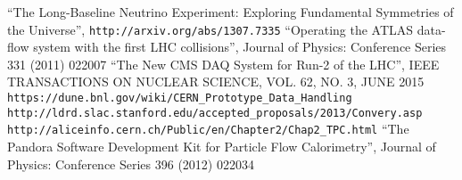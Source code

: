 \begin{thebibliography}{99}

 ``The Long-Baseline Neutrino Experiment: Exploring Fundamental Symmetries of the Universe'',  \verb!http://arxiv.org/abs/1307.7335!
 ``Operating the ATLAS data-flow system with the first LHC collisions'', Journal of Physics: Conference Series 331 (2011) 022007
 ``The New CMS DAQ System for Run-2 of the LHC'', IEEE TRANSACTIONS ON NUCLEAR SCIENCE, VOL. 62, NO. 3, JUNE 2015
 \verb!https://dune.bnl.gov/wiki/CERN_Prototype_Data_Handling!
 \verb!http://ldrd.slac.stanford.edu/accepted_proposals/2013/Convery.asp!
 \verb!http://aliceinfo.cern.ch/Public/en/Chapter2/Chap2_TPC.html!
 ``The Pandora Software Development Kit for Particle Flow Calorimetry'', Journal of Physics: Conference Series 396 (2012) 022034
\end{thebibliography}